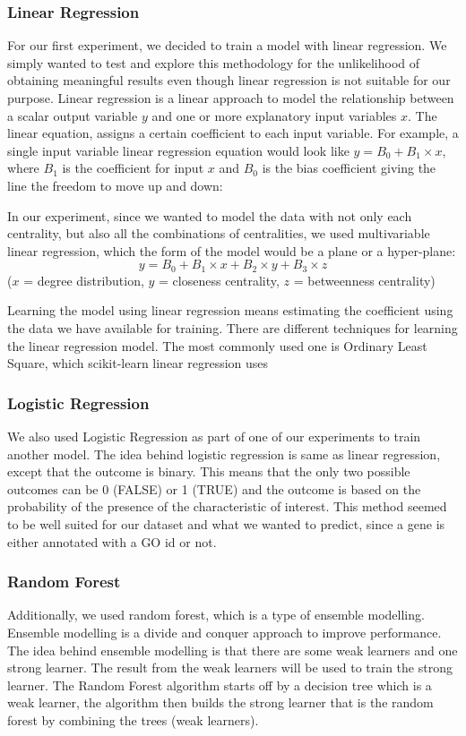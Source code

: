 \documentclass[9pt]{article}
\begin{document}
\subsubsection{Linear Regression}
For our first experiment, we decided to train a model with linear regression. We simply wanted to test and explore this methodology for the unlikelihood of obtaining meaningful results even though linear regression is not suitable for our purpose. Linear regression is a linear approach to model the relationship between a scalar output variable \(y\) and one or more explanatory input variables \(x\). The linear equation, assigns a certain coefficient to each input variable. For example, a single input variable linear regression equation would look like $y = B_0 + B_1\times{x}$, where \(B_1\) is the coefficient for input \(x\) and \(B_0\) is the bias coefficient giving the line the freedom to move up and down: 

In our experiment, since we wanted to model the data with not only each centrality, but also all the combinations of centralities, we used multivariable linear regression, which the form of the model would be a plane or a hyper-plane:
\begin{equation}
y=B_0 + B_1\times{x} + B_2\times{y} + B_3\times{z}  
\end{equation}
(\(x\) = degree distribution, \(y\) = closeness centrality, \(z\) = betweenness centrality)

Learning the model using linear regression means estimating the coefficient using the data we have available for training. There are different techniques for learning the linear regression model. The most commonly used one is Ordinary Least Square, which scikit-learn linear regression uses

\subsubsection{Logistic Regression}
We also used Logistic Regression as part of one of our experiments to train another model. The idea behind logistic regression is same as linear regression, except that the outcome is binary. This means that the only two possible outcomes can be 0 (FALSE) or 1 (TRUE) and the outcome is based on the probability of the presence of the characteristic of interest. This method seemed to be well suited for our dataset and what we wanted to predict, since a gene is either annotated with a GO id or not. 

\subsubsection{Random Forest}
Additionally, we used random forest, which is a type of ensemble modelling. Ensemble modelling is a divide and conquer approach to improve performance. The idea behind ensemble modelling is that there are some weak learners and one strong learner. The result from the weak learners will be used to train the strong learner. The Random Forest algorithm starts off by a decision tree which is a weak learner, the algorithm then builds the strong learner that is the random forest by combining the trees (weak learners).
\end{document}
